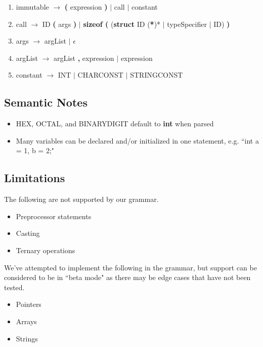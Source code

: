 \documentclass{scrartcl}
\begin{document}
\begin{enumerate}
\item immutable $\rightarrow$
    \textbf{(} expression \textbf{)}
    $|$ call
    $|$ constant

\item call $\rightarrow$
    ID \textbf{(} args \textbf{)}
    $|$ \textbf{sizeof (} (\textbf{struct} ID (\textbf{*})* $|$ typeSpecifier $|$ ID) \textbf{)}

\item args $\rightarrow$
    argList $|$ $\epsilon$

\item argList $\rightarrow$
    argList \textbf{,} expression $|$ expression

\item constant $\rightarrow$
    INT $|$ CHARCONST $|$ STRINGCONST
\end{enumerate}

\subsection{Semantic Notes}
\begin{itemize}
    \item HEX, OCTAL, and BINARYDIGIT default to \textbf{int} when parsed
    \item Many variables can be declared and/or initialized in one statement, e.g. ``int a = 1, b = 2;"
\end{itemize}

\subsection{Limitations}
The following are not supported by our grammar.
\begin{itemize}
    \item Preprocessor statements
    \item Casting
    \item Ternary operations
\end{itemize}
We've attempted to implement the following in the grammar, but support can be considered to be in ``beta mode" as there may be edge cases that have not been tested.
\begin{itemize}
    \item Pointers
    \item Arrays
    \item Strings
\end{itemize}
\end{document}

